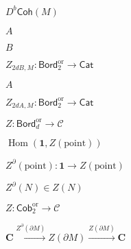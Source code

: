 \begin{preview}
\setcounter{equation}{0}%
\( D^b \mathsf{Coh}(M)  \)
\end{preview}

\begin{preview}
\setcounter{equation}{0}%
\( A \)
\end{preview}

\begin{preview}
\setcounter{equation}{0}%
\( B \)
\end{preview}

\begin{preview}
\setcounter{equation}{0}%
\( Z_{2dB, M} : \mathsf{Bord}_2^{\mathrm{or}} \to \mathsf{Cat} \)
\end{preview}

\begin{preview}
\setcounter{equation}{0}%
\( A \)
\end{preview}

\begin{preview}
\setcounter{equation}{0}%
\( Z_{2dA,M} : \mathsf{Bord}^{\mathrm{or}}_2 \to \mathsf{Cat} \)
\end{preview}

\begin{preview}
\setcounter{equation}{0}%
\( Z : \mathsf{Bord}_d^{\mathrm{or}} \to \mathcal{C} \)
\end{preview}

\begin{preview}
\setcounter{equation}{0}%
\( \operatorname*{Hom}(\mathbf{1}, Z(\text{point})) \)
\end{preview}

\begin{preview}
\setcounter{equation}{0}%
\( Z^{\partial}(\text{point}) : \mathbf{1} \to Z(\text{point}) \)
\end{preview}

\begin{preview}
\setcounter{equation}{0}%
\( Z^{\partial}(N) \in Z(N) \)
\end{preview}

\begin{preview}
\setcounter{equation}{0}%
\( Z : \mathsf{Cob}_{2}^{\mathrm{or}} \to \mathcal{C} \)
\end{preview}

\begin{preview}
\setcounter{equation}{0}%
\( \mathbf{C} \xrightarrow{Z^{\partial}(\partial M)} Z(\partial M) \xrightarrow{ Z(\partial M)} \mathbf{C}  \)
\end{preview}

